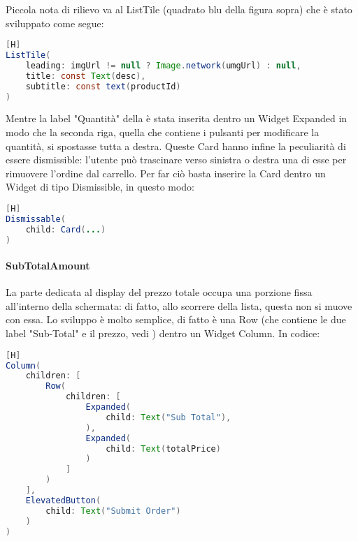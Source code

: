 \noindent
Piccola nota di rilievo va al ListTile (quadrato blu della figura sopra) che è stato sviluppato come segue:
\begin{lstlisting}[language=Java, firstnumber=122][H]
ListTile(
	leading: imgUrl != null ? Image.network(umgUrl) : null,
	title: const Text(desc),
	subtitle: const text(productId)
)
\end{lstlisting}

\noindent
Mentre la label "Quantità" della  è stata inserita dentro un Widget Expanded in modo che la seconda riga, quella che contiene i pulsanti per modificare la quantità, si spostasse tutta a destra.
Queste Card hanno infine la peculiarità di essere dismissible: l'utente può trascinare verso sinistra o destra una di esse per rimuovere l'ordine dal carrello. Per far ciò basta inserire la Card dentro un Widget di tipo Dismissible, in questo modo:
\begin{lstlisting}[language=Java, firstnumber=1][H]
Dismissable(
	child: Card(...)
)
\end{lstlisting}

\noindent

\paragraph{SubTotalAmount}
La parte dedicata al display del prezzo totale occupa una porzione fissa all'interno della schermata: di fatto, allo scorrere della lista, questa non si muove con essa. Lo sviluppo è molto semplice, di fatto è una Row (che contiene le due label "Sub-Total" e il prezzo, vedi ) dentro un Widget Column. In codice:
\begin{lstlisting}[language=Java, firstnumber=1][H]
Column(
	children: [
		Row(
			children: [
				Expanded(
					child: Text("Sub Total"),
				),
				Expanded(
					child: Text(totalPrice)
				)
			]
		)
	],
	ElevatedButton(
		child: Text("Submit Order")
	)
)
\end{lstlisting}

\noindent
